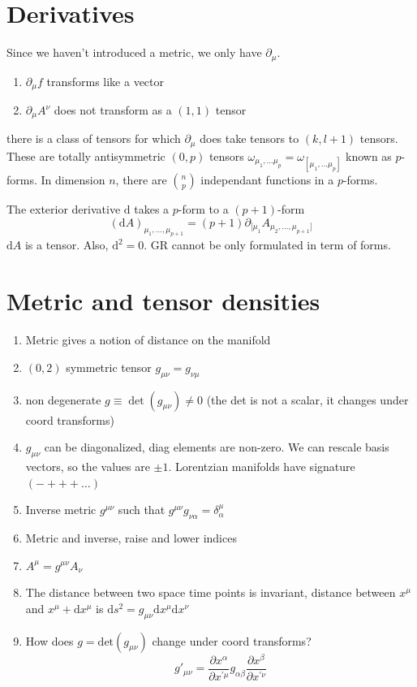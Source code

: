 \documentclass[a4paper]{book}
\theoremstyle{definition}
\theoremstyle{remark}
\begin{document}
\section{Derivatives}
Since we haven't introduced a metric, we only have $\partial_\mu$.
\begin{enumerate}
    \item $\partial_\mu f$ transforms like a vector 
    \item $\partial_\mu A^\nu$ does not transform as a $(1, 1)$ tensor 
\end{enumerate}
there is a class of tensors for which $\partial_\mu$ does take tensors to $(k, l+1)$ tensors. These are totally antisymmetric $(0, p)$ tensors $\omega_{\mu_1, \dots \mu_p} = \omega_{[\mu_1, \dots \mu_p]}$ known as $p$-forms. In dimension $n$, there are $\binom{n}{p}$ independant functions in a $p$-forms. \par \medskip 
The exterior derivative $\text{d}$ takes a $p$-form to a $(p+1)$-form 
\begin{equation}
    (\text{d}A)_{\mu_1,\dots,\mu_{p+1}} = (p+1)\partial_{[\mu_1}A_{\mu_2, \dots, \mu_{p+1}]}
\end{equation}
$\text{d}A$ is a tensor. Also, $\text{d}^2 = 0$. GR cannot be only formulated in term of forms. 

\section{Metric and tensor densities}
\begin{enumerate}
    \item Metric gives a notion of distance on the manifold 
    \item $(0, 2)$ symmetric tensor $g_{\mu\nu} = g_{\nu\mu}$
    \item non degenerate $g \equiv \det(g_{\mu\nu}) \neq 0$ (the det is not a scalar, it changes under coord transforms)
    \item $g_{\mu\nu}$ can be diagonalized, diag elements are non-zero. We can rescale basis vectors, so the values are $\pm1$. Lorentzian manifolds have signature $(-+++\dots)$ 
    \item Inverse metric $g^{\mu\nu}$ such that $g^{\mu\nu}g_{\nu\alpha} = \delta^\mu_\alpha$
    \item Metric and inverse, raise and lower indices 
    \item $A^\mu = g^{\mu\nu}A_\nu$
    \item The distance between two space time points is invariant, distance between $x^\mu$ and $x^\mu + \text{d}x^\mu$ is $\text{d}s^2 = g_{\mu\nu}\text{d}x^\mu \text{d}x^\nu$
    \item How does $g = \text{det}(g_{\mu\nu})$ change under coord transforms? 
    \begin{equation}
        g'_{\mu\nu} = \frac{\partial x^{\alpha}}{\partial x^{'\mu}}g_{\alpha\beta} \frac{\partial x^\beta}{\partial x^{'\nu}}
    \end{equation}
\end{enumerate}
\end{document}
